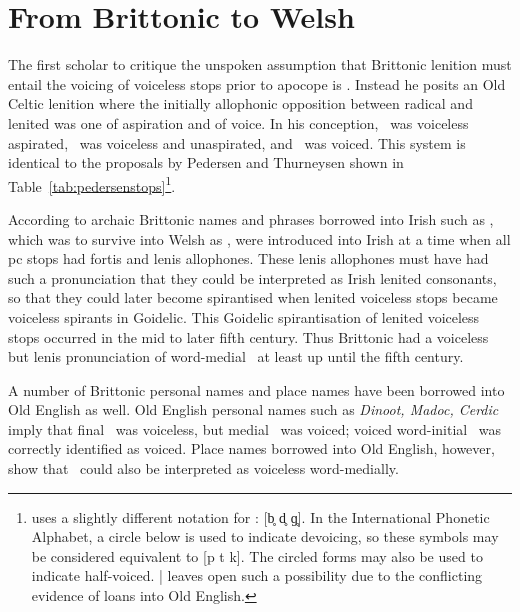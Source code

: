 \section{From Brittonic to Welsh}
\label{sec:from-brittonic-welsh}
The first scholar to critique the unspoken assumption that Brittonic lenition must entail the voicing of voiceless stops prior to apocope is \textcite{koch_*cothairche_1990}. Instead he posits an Old Celtic lenition where the initially allophonic opposition between radical and lenited was one of aspiration and of voice.  In his conception, \xT\ was voiceless aspirated, \lT\ was voiceless and unaspirated, and \xD\ was voiced. This system is identical to the proposals by Pedersen and Thurneysen shown in Table~\ref{tab:pedersenstops}\footnote{\Textcite{koch_*cothairche_1990} uses a slightly different notation for \lT: [b̥ d̥ ɡ̥]. In the International Phonetic Alphabet, a circle below is used to indicate devoicing, so these symbols may be considered equivalent to [p t k]. The circled forms may also be used to indicate half-voiced. \Textcite[§~29]{koch_*cothairche_1990}| leaves open such a possibility due to the conflicting evidence of loans into Old English.}.

According to \textcite{koch_*cothairche_1990} archaic Brittonic names and phrases borrowed into Irish such as , which was to survive into Welsh as , were introduced into Irish at a time when all \gls{pc} stops had fortis and lenis allophones. These lenis allophones must have had such a pronunciation that they could be interpreted as Irish lenited consonants, so that they could later become spirantised when lenited voiceless stops became voiceless spirants in Goidelic. This Goidelic spirantisation of lenited voiceless stops occurred in the mid to later fifth century. Thus Brittonic had a voiceless but lenis pronunciation of word-medial \lT\ at least up until the fifth century.

A number of Brittonic personal names and place names have been borrowed into Old English as well. Old English personal names such as \textit{Dinoot, Madoc, Cerdic} imply that final \lT\ was voiceless, but medial \lT\ was voiced; voiced word-initial \xD\ was correctly identified as voiced. Place names borrowed into Old English, however, show that \lT\ could also be interpreted as voiceless word-medially.

